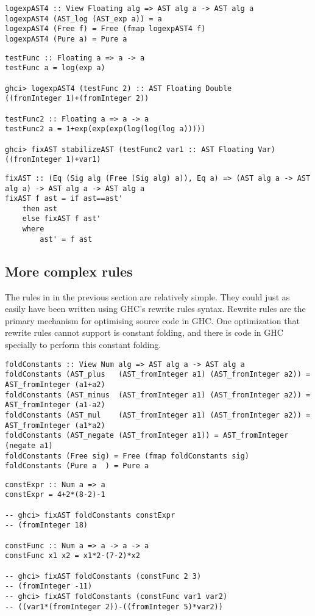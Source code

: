 \documentclass[preprint]{sigplanconf}
\theoremstyle{definition}
\begin{document}
\begin{lstlisting}
logexpAST4 :: View Floating alg => AST alg a -> AST alg a
logexpAST4 (AST_log (AST_exp a)) = a
logexpAST4 (Free f) = Free (fmap logexpAST4 f)
logexpAST4 (Pure a) = Pure a
\end{lstlisting}

\begin{lstlisting}
testFunc :: Floating a => a -> a
testFunc a = log(exp a)

ghci> logexpAST4 (testFunc 2) :: AST Floating Double
((fromInteger 1)+(fromInteger 2))

testFunc2 :: Floating a => a -> a
testFunc2 a = 1+exp(exp(exp(log(log(log a)))))

ghci> fixAST stabilizeAST (testFunc2 var1 :: AST Floating Var)
((fromInteger 1)+var1)
\end{lstlisting}

\begin{lstlisting}
fixAST :: (Eq (Sig alg (Free (Sig alg) a)), Eq a) => (AST alg a -> AST alg a) -> AST alg a -> AST alg a
fixAST f ast = if ast==ast'
    then ast
    else fixAST f ast'
    where
        ast' = f ast
\end{lstlisting}

\subsection{More complex rules}

The rules in in the previous section are relatively simple.
They could just as easily have been written using GHC's rewrite rules syntax.
Rewrite rules are the primary mechanism for optimising source code in GHC.
One optimization that rewrite rules cannot support is constant folding,
and there is code in GHC specially to perform this constant folding.

\begin{lstlisting}
foldConstants :: View Num alg => AST alg a -> AST alg a
foldConstants (AST_plus   (AST_fromInteger a1) (AST_fromInteger a2)) = AST_fromInteger (a1+a2)
foldConstants (AST_minus  (AST_fromInteger a1) (AST_fromInteger a2)) = AST_fromInteger (a1-a2)
foldConstants (AST_mul    (AST_fromInteger a1) (AST_fromInteger a2)) = AST_fromInteger (a1*a2)
foldConstants (AST_negate (AST_fromInteger a1)) = AST_fromInteger (negate a1)
foldConstants (Free sig) = Free (fmap foldConstants sig)
foldConstants (Pure a  ) = Pure a
\end{lstlisting}

\begin{lstlisting}
constExpr :: Num a => a
constExpr = 4+2*(8-2)-1

-- ghci> fixAST foldConstants constExpr
-- (fromInteger 18)

constFunc :: Num a => a -> a -> a
constFunc x1 x2 = x1*2-(7-2)*x2

-- ghci> fixAST foldConstants (constFunc 2 3)
-- (fromInteger -11)
-- ghci> fixAST foldConstants (constFunc var1 var2)
-- ((var1*(fromInteger 2))-((fromInteger 5)*var2))
\end{lstlisting}
\end{document}
